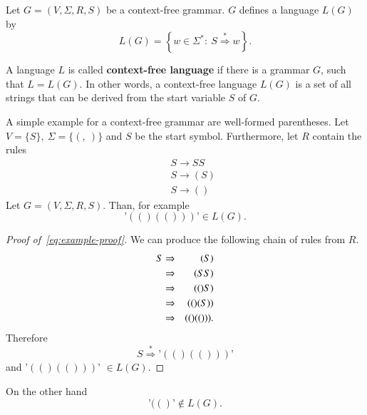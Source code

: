 \begin{definition}
Let $G = (V, \Sigma, R, S)$ be a context-free grammar. $G$ defines a language $L(G)$ by
\begin{equation}
L(G) = \left\{ w \in \Sigma^\ast:\ S \overset{\ast}{\Rightarrow} w \right\}.
\end{equation}
\end{definition}

A language $L$ is called \textbf{context-free language} if there is a grammar $G$, such that $L = L(G)$. In other words, a context-free language $L(G)$ is a set of all strings that can be derived from the start variable $S$ of $G$.

\begin{example}\label{ex:cfl}
A simple example for a context-free grammar are well-formed parentheses. Let $V = \{S\},\ \Sigma = \{(,\ )\}$ and $S$ be the start symbol. Furthermore, let $R$ contain the rules
\begin{eqnarray}
&&S \longrightarrow SS\\
&&S \longrightarrow (S)\\
&&S \longrightarrow ()
\end{eqnarray}
Let $G = (V, \Sigma, R, S)$. Than, for example
\begin{equation}\label{eq:example-proof}
\text{'}(()(()))\text{'} \in L(G).
\end{equation}
\end{example}

\begin{proof}[Proof of~\ref{eq:example-proof}]
We can produce the following chain of rules from $R$.
\begin{eqnarray}
S &\Rightarrow & (S)\label{eq:chain}\\
&\Rightarrow & (SS)\notag\\
&\Rightarrow & (()S)\notag\\
&\Rightarrow & (()(S))\notag\\
&\Rightarrow & (()(())).\notag
\end{eqnarray}
Therefore
\begin{equation}
S \overset{\ast}{\Rightarrow} \text{'}(()(()))\text{'} 
\end{equation}
and '$(()(()))$' $\in L(G)$.
\end{proof}

On the other hand
\begin{equation}
\text{'}(()\text{'} \not\in L(G).
\end{equation}

